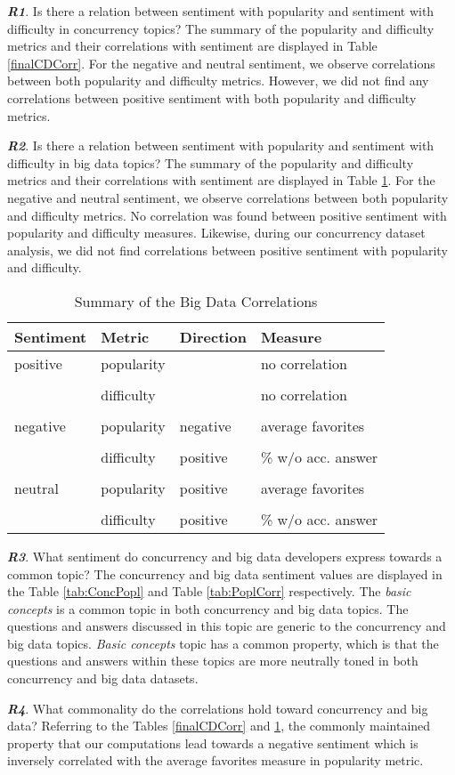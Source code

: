 \emph{\textbf{R1}}. Is there a relation between sentiment with popularity and sentiment with difficulty in concurrency topics? The summary of the popularity and difficulty metrics and their correlations with sentiment are displayed in Table \ref{finalCDCorr}. For the negative and neutral sentiment, we observe correlations between both popularity and difficulty metrics. However, we did not find any correlations between positive sentiment with both popularity and difficulty metrics.

\emph{\textbf{R2}}. Is there a relation between sentiment with popularity and sentiment with difficulty in big data topics? The summary of the popularity and difficulty metrics and their correlations with sentiment are displayed in Table \ref{finalBDCorr}. For the negative and neutral sentiment, we observe correlations between both popularity and difficulty metrics. No correlation was found between positive sentiment with popularity and difficulty measures. Likewise, during our concurrency dataset analysis, we did not find correlations between positive sentiment with popularity and difficulty.

\begin{table}[b!ht]
\caption{Summary of the Big Data Correlations}
\label{finalBDCorr}
\centering
\begin{tabular}{llll} \hline
\textbf{Sentiment} & \textbf{Metric} & \textbf{Direction}&\textbf{Measure}\\ \hline
positive & popularity & & no correlation \\
\\
& difficulty & & no correlation\\
\\
negative & popularity & negative & average favorites\\
\\
& difficulty & positive & \% w/o acc. answer\\
\\
neutral & popularity & positive & average favorites \\
\\
& difficulty & positive & \% w/o acc. answer \\ \hline
\end{tabular}
\end{table}

\emph{\textbf{R3}}. What sentiment do concurrency and big data developers express towards a common topic? The concurrency and big data sentiment values are displayed in the Table \ref{tab:ConcPopl} and Table \ref{tab:PoplCorr} respectively. The \emph{basic concepts} is a common topic in both concurrency and big data topics. The questions and answers discussed in this topic are generic to the concurrency and big data topics. \emph{Basic concepts} topic has a common property, which is that the questions and answers within these topics are more neutrally toned in both concurrency and big data datasets.

\emph{\textbf{R4}}. What commonality do the correlations hold toward concurrency and big data?
Referring to the Tables \ref{finalCDCorr} and \ref{finalBDCorr}, the commonly maintained property that our computations lead towards a negative sentiment which is inversely correlated with the average favorites measure in popularity metric.